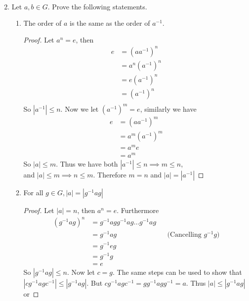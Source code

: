 \documentclass[12pt]{article}
\newcommand\setitemnumber[1]{\setcounter{enumi}{\numexpr#1-1\relax}}
\begin{document}
\begin{enumerate}[label=\textbf{\arabic*}.]
\begin{align*}
    \end{align*}
    \pagebreak
    \setitemnumber{23}
    \item Let $a,b \in G$. Prove the following statements.
    \begin{enumerate}
        \item The order of $a$ is the same as the order of $a^{-1}$.
        \begin{proof} Let $a^n = e$, then 
            \begin{align*}
                e &= {(aa^{-1})}^n \\
                  &= a^n{(a^{-1})}^n \\
                  &= e{(a^{-1})}^n \\
                  &= {(a^{-1})}^n \\
            \end{align*}
            So $|a^{-1}| \leq n$. Now we let ${(a^{-1})}^m = e$, similarly we have
            \begin{align*}
                e &= {(aa^{-1})}^m \\
                  &= a^m{(a^{-1})}^m \\
                  &= a^{m}e \\
                  &= a^m
            \end{align*}
            So $|a| \leq m$. Thus we have both $|a^{-1}| \leq n \implies m \leq n$, \\ 
            and $|a| \leq m \implies n \leq m$. Therefore $m = n$ and $|a| = |a^{-1}|$
        \end{proof}
        \item For all $g \in G, |a| = |g^{-1}ag|$
        \begin{proof} Let $|a|=n$, then $a^n=e$. Furthermore
            \begin{align*}
                {(g^{-1}ag)}^{n} &= g^{-1}agg^{-1}ag \dots g^{-1}ag \\
                                 &= g^{-1}ag && \text{(Cancelling $g^{-1}g$)} \\
                                 &= g^{-1}eg \\
                                 &= g^{-1}g \\
                                 &= e
            \end{align*}
            So $|g^{-1}ag| \leq n$. Now let $c = g$. The same steps can be used to show that 
            $|cg^{-1}agc^{-1}| \leq |g^{-1}ag|$. But $cg^{-1}agc^{-1} = gg^{-1}agg^{-1} = a$. Thus $|a| \leq |g^{-1}ag|$ or 

\end{proof}
\end{enumerate}
\end{enumerate}
\end{document}
